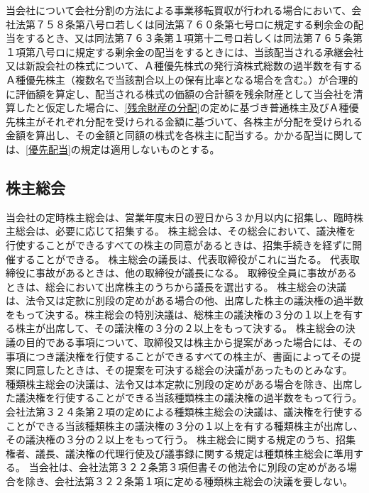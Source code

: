 \documentclass[10pt,a4paper,uplatex]{jsarticle}
\begin{document}
\term 当会社について会社分割の方法による事業移転買収が行われる場合において、会社法第７５８条第八号ロ若しくは同法第７６０条第七号ロに規定する剰余金の配当をするとき、又は同法第７６３条第１項第十二号ロ若しくは同法第７６５条第１項第八号ロに規定する剰余金の配当をするときには、当該配当される承継会社又は新設会社の株式について、Ａ種優先株式の発行済株式総数の過半数を有するＡ種優先株主（複数名で当該割合以上の保有比率となる場合を含む。）が合理的に評価額を算定し、配当される株式の価額の合計額を残余財産として当会社を清算したと仮定した場合に、\ref{残余財産の分配}の定めに基づき普通株主及びＡ種優先株主がそれぞれ分配を受けられる金額に基づいて、各株主が分配を受けられる金額を算出し、その金額と同額の株式を各株主に配当する。かかる配当に関しては、\ref{優先配当}の規定は適用しないものとする。

\subsection{株主総会}
当会社の定時株主総会は、営業年度末日の翌日から３か月以内に招集し、臨時株主総会は、必要に応じて招集する。
株主総会は、その総会において、議決権を行使することができるすべての株主の同意があるときは、招集手続きを経ずに開催することができる。
株主総会の議長は、代表取締役がこれに当たる。
\term 代表取締役に事故があるときは、他の取締役が議長になる。
\term 取締役全員に事故があるときは、総会において出席株主のうちから議長を選出する。
株主総会の決議は、法令又は定款に別段の定めがある場合の他、出席した株主の議決権の過半数をもって決する。株主総会の特別決議は、総株主の議決権の３分の１以上を有する株主が出席して、その議決権の３分の２以上をもって決する。
株主総会の決議の目的である事項について、取締役又は株主から提案があった場合には、その事項につき議決権を行使することができるすべての株主が、書面によってその提案に同意したときは、その提案を可決する総会の決議があったものとみなす。
種類株主総会の決議は、法令又は本定款に別段の定めがある場合を除き、出席した議決権を行使することができる当該種類株主の議決権の過半数をもって行う。
\label{種類株主総会}
\term 会社法第３２４条第２項の定めによる種類株主総会の決議は、議決権を行使することができる当該種類株主の議決権の３分の１以上を有する種類株主が出席し、その議決権の３分の２以上をもって行う。
\term 株主総会に関する規定のうち、招集権者、議長、議決権の代理行使及び議事録に関する規定は種類株主総会に準用する。
\term 当会社は、会社法第３２２条第３項但書その他法令に別段の定めがある場合を除き、会社法第３２２条第１項に定める種類株主総会の決議を要しない。
\end{document}
